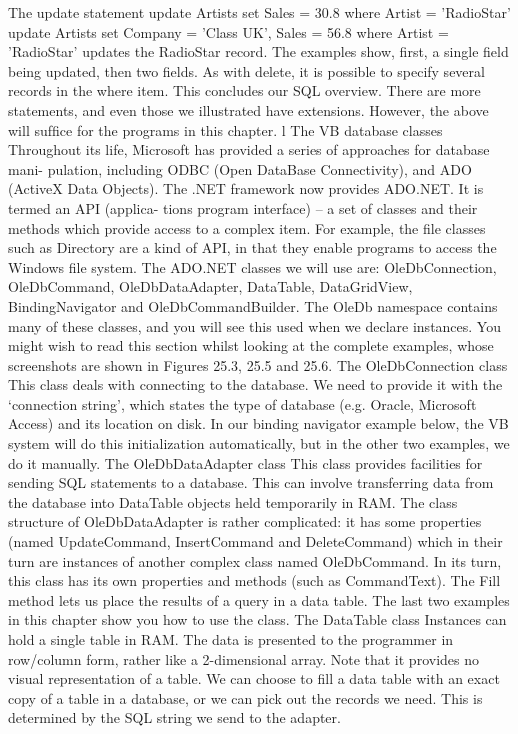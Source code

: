 The update statement
update Artists set Sales = 30.8 where Artist = 'RadioStar'
update Artists set Company = 'Class UK', Sales = 56.8
	where Artist = 'RadioStar'
updates the RadioStar record. The examples show, ﬁrst, a single ﬁeld being updated, then two ﬁelds. As with delete, it is possible to specify several records in the where item.
This concludes our SQL overview. There are more statements, and even those we 
illustrated have extensions. However, the above will sufﬁce for the programs in this chapter.
l	The VB database classes
Throughout its life, Microsoft has provided a series of approaches for database mani-
pulation, including ODBC (Open DataBase Connectivity), and ADO (ActiveX Data Objects). The .NET framework now provides ADO.NET. It is termed an API (applica-
tions program interface) – a set of classes and their methods which provide access to a complex item. For example, the ﬁle classes such as Directory are a kind of API, in that they enable programs to access the Windows ﬁle system.
The ADO.NET classes we will use are:
OleDbConnection, OleDbCommand, OleDbDataAdapter, DataTable, DataGridView, BindingNavigator and OleDbCommandBuilder.
The OleDb namespace contains many of these classes, and you will see this used when we declare instances.
You might wish to read this section whilst looking at the complete examples, whose screenshots are shown in Figures 25.3, 25.5 and 25.6.
The OleDbConnection class
This class deals with connecting to the database. We need to provide it with the ‘connection string’, which states the type of database (e.g. Oracle, Microsoft Access) and its location on disk. In our binding navigator example below, the VB system will do this initialization automatically, but in the other two examples, we do it manually.
The OleDbDataAdapter class
This class provides facilities for sending SQL statements to a database. This can involve transferring data from the database into DataTable objects held temporarily in RAM.
The class structure of OleDbDataAdapter is rather complicated: it has some properties (named UpdateCommand, InsertCommand and DeleteCommand) which in their turn are instances of another complex class named OleDbCommand. In its turn, this class has its own properties and methods (such as CommandText). The Fill method lets us place the results of a query in a data table. The last two examples in this chapter show you how to use the class.
The DataTable class
Instances can hold a single table in RAM. The data is presented to the programmer in row/column form, rather like a 2-dimensional array. Note that it provides no visual representation of a table. We can choose to ﬁll a data table with an exact copy of a table in a database, or we can pick out the records we need. This is determined by the SQL string we send to the adapter.
